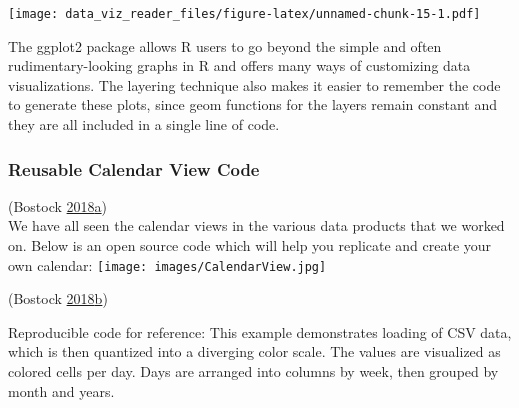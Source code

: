 \documentclass[]{book}
\begin{document}
\texttt{[image: data\_viz\_reader\_files/figure-latex/unnamed-chunk-15-1.pdf]}

The ggplot2 package allows R users to go beyond the simple and often rudimentary-looking graphs in R and offers many ways of customizing data visualizations. The layering technique also makes it easier to remember the code to generate these plots, since geom functions for the layers remain constant and they are all included in a single line of code.

\hypertarget{reusable-calendar-view-code}{%
\subsubsection{Reusable Calendar View Code}\label{reusable-calendar-view-code}}

(Bostock \protect\hyperlink{ref-Calendar_Layout}{2018}\protect\hyperlink{ref-Calendar_Layout}{a})\\
We have all seen the calendar views in the various data products that we worked on. Below is an open source code which will help you replicate and create your own calendar:
\texttt{[image: images/CalendarView.jpg]}

(Bostock \protect\hyperlink{ref-CalendarView}{2018}\protect\hyperlink{ref-CalendarView}{b})

Reproducible code for reference:
This example demonstrates loading of CSV data, which is then quantized into a diverging color scale. The values are visualized as colored cells per day. Days are arranged into columns by week, then grouped by month and years.
\end{document}
